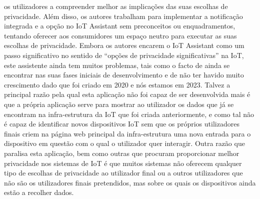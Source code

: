 \documentclass[conference]{IEEEtran}
\begin{document}
os utilizadores a compreender melhor as implicações das suas escolhas de
privacidade. Além disso, os autores trabalham para implementar a notificação
integrada e a opção no IoT Assistant sem preconceitos ou enquadramentos,
tentando oferecer aos consumidores um espaço neutro para executar as suas
escolhas de privacidade. Embora os autores encarem o IoT Assistant como
um passo significativo no sentido de ``opções de privacidade significativas''
na IoT, este assistente ainda tem muitos problemas, tais como o facto de
ainda se encontrar nas suas fases iniciais de desenvolvimento e de não ter
havido muito crescimento dado que foi criado em 2020 e nós estamos em 2023.
Talvez a principal razão pela qual esta aplicação não foi capaz de ser
desenvolvida mais é que a própria aplicação serve para mostrar ao utilizador
os dados que já se encontram na infra-estrutura da IoT que foi criada
anteriormente, e como tal não é capaz de identificar novos dispositivos
IoT sem que os próprios utilizadores finais criem na página web principal \cite{DasPersonalized}
da infra-estrutura uma nova entrada para o dispositivo em questão com o
qual o utilizador quer interagir. Outra razão que paralisa esta aplicação,
bem como outras que procuram proporcionar melhor privacidade nos sistemas de
IoT é que muitos sistemas não oferecem qualquer tipo de escolhas de privacidade
ao utilizador final ou a outros utilizadores que não são os utilizadores
finais pretendidos, mas sobre os quais os dispositivos ainda estão a recolher
dados.
\end{document}
